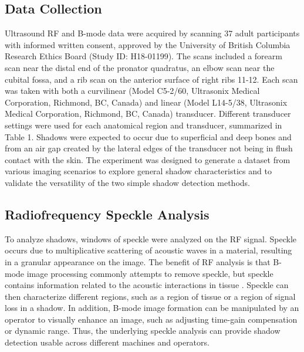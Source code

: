\documentclass[authoryear,preprint,review,12pt]{elsarticle}
\begin{document}
\subsection*{Data Collection}
Ultrasound RF and B-mode data were acquired by scanning 37 adult participants with informed written consent, approved by the University of British Columbia Research Ethics Board (Study ID: H18-01199). The scans included a forearm scan near the distal end of the pronator quadratus, an elbow scan near the cubital fossa, and a rib scan on the anterior surface of right ribs 11-12. Each scan was taken with both a curvilinear (Model C5-2/60, Ultrasonix Medical Corporation, Richmond, BC, Canada) and linear (Model L14-5/38, Ultrasonix Medical Corporation, Richmond, BC, Canada) transducer. Different transducer settings were used for each anatomical region and transducer, summarized in Table 1. Shadows were expected to occur due to superficial and deep bones and from an air gap created by the lateral edges of the transducer not being in flush contact with the skin. The experiment was designed to generate a dataset from various imaging scenarios to explore general shadow characteristics and to validate the versatility of the two simple shadow detection methods. 

\subsection*{Radiofrequency Speckle Analysis}      
To analyze shadows, windows of speckle were analyzed on the RF signal. Speckle occurs due to multiplicative scattering of acoustic waves in a material, resulting in a granular appearance on the image. The benefit of RF analysis is that B-mode image processing commonly attempts to remove speckle, but speckle contains information related to the acoustic interactions in tissue \citep{Burckhardt1978}. Speckle can then characterize different regions, such as a region of tissue or a region of signal loss in a shadow. In addition, B-mode image formation can be manipulated by an operator to visually enhance an image, such as adjusting time-gain compensation or dynamic range. Thus, the underlying speckle analysis can provide shadow detection usable across different machines and operators.
\end{document}
